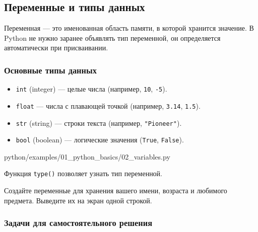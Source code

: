 \subsection{Переменные и типы данных}

Переменная — это именованная область памяти, в которой хранится значение. В Python не нужно заранее объявлять тип переменной, он определяется автоматически при присваивании.

\subsubsection*{Основные типы данных}
\begin{itemize}
    \item \texttt{int} (integer) — целые числа (например, \texttt{10}, \texttt{-5}).
    \item \texttt{float} — числа с плавающей точкой (например, \texttt{3.14}, \texttt{1.5}).
    \item \texttt{str} (string) — строки текста (например, \texttt{"Pioneer"}).
    \item \texttt{bool} (boolean) — логические значения (\texttt{True}, \texttt{False}).
\end{itemize}

\begin{codefile}[python]{python/examples/01_python_basics/02_variables.py}
\end{codefile}

Функция \texttt{type()} позволяет узнать тип переменной.

\begin{taskbox}
Создайте переменные для хранения вашего имени, возраста и любимого предмета. Выведите их на экран одной строкой.
\end{taskbox}

\subsubsection*{Задачи для самостоятельного решения}

